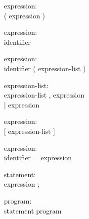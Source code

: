 \documentclass[12pt]{article}
\begin{document}
\begin{description}
  \item[]expression: \hfill \\
    ( expression )
\end{description}

\begin{description}
  \item[]expression: \hfill \\
    identifier
\end{description}

\begin{description}
  \item[]expression: \hfill \\
    identifier ( expression-list )
\end{description}

\begin{description}
  \item[]expression-list: \hfill \\
    expression-list , expression \\
    | expression
\end{description}

\begin{description}
  \item[]expression: \hfill \\
    $[$ expression-list $]$
\end{description}

\begin{description}
  \item[]expression: \hfill \\
    identifier = expression
\end{description}

\begin{description}
  \item[]statement: \hfill \\
    expression ;
\end{description}

\begin{description}
  \item[]program: \hfill \\
    statement program
\end{description}
\end{document}
